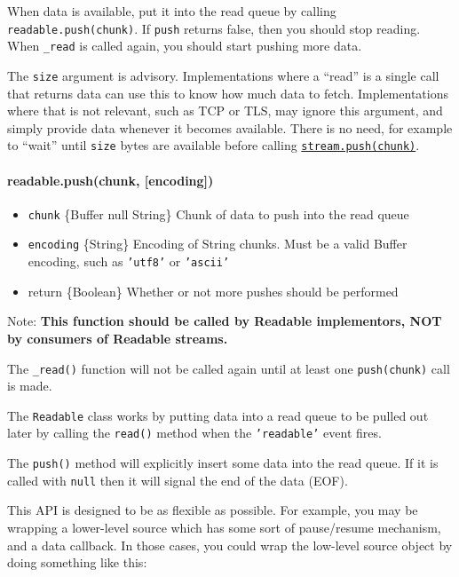 When data is available, put it into the read queue by calling
\texttt{readable.push(chunk)}. If \texttt{push} returns false, then you
should stop reading. When \texttt{\_read} is called again, you should
start pushing more data.

The \texttt{size} argument is advisory. Implementations where a ``read''
is a single call that returns data can use this to know how much data to
fetch. Implementations where that is not relevant, such as TCP or TLS,
may ignore this argument, and simply provide data whenever it becomes
available. There is no need, for example to ``wait'' until \texttt{size}
bytes are available before calling
\hyperref[streamux5freadableux5fpushux5fchunkux5fencoding]{\texttt{stream.push(chunk)}}.

\paragraph{readable.push(chunk,
{[}encoding{]})}\label{readable.pushchunk-encoding}

\begin{itemize}
\itemsep1pt\parskip0pt
\item
  \texttt{chunk} \{Buffer \textbar{} null \textbar{} String\} Chunk of
  data to push into the read queue
\item
  \texttt{encoding} \{String\} Encoding of String chunks. Must be a
  valid Buffer encoding, such as \texttt{'utf8'} or \texttt{'ascii'}
\item
  return \{Boolean\} Whether or not more pushes should be performed
\end{itemize}

Note: \textbf{This function should be called by Readable implementors,
NOT by consumers of Readable streams.}

The \texttt{\_read()} function will not be called again until at least
one \texttt{push(chunk)} call is made.

The \texttt{Readable} class works by putting data into a read queue to
be pulled out later by calling the \texttt{read()} method when the
\texttt{'readable'} event fires.

The \texttt{push()} method will explicitly insert some data into the
read queue. If it is called with \texttt{null} then it will signal the
end of the data (EOF).

This API is designed to be as flexible as possible. For example, you may
be wrapping a lower-level source which has some sort of pause/resume
mechanism, and a data callback. In those cases, you could wrap the
low-level source object by doing something like this:

